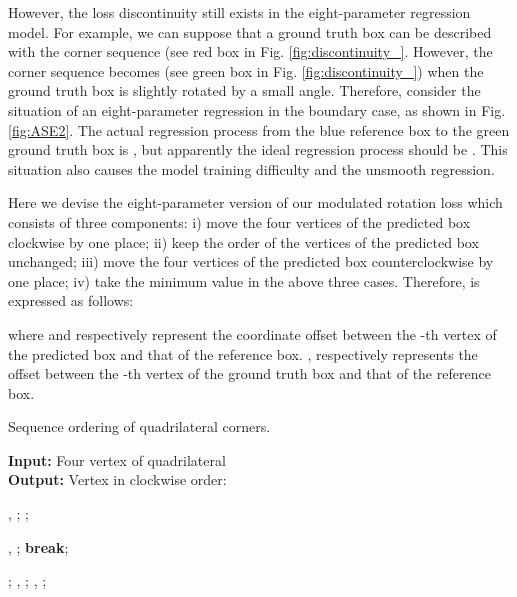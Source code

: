 \documentclass[10pt,twocolumn,letterpaper]{article}
\begin{document}
However, the loss discontinuity still exists in the eight-parameter regression model. For example, we can suppose that a ground truth box can be described with the corner sequence  (see red box in Fig. \ref{fig:discontinuity_}. However, the corner sequence becomes  (see green box in Fig. \ref{fig:discontinuity_}) when the ground truth box is slightly rotated by a small angle. Therefore, consider the situation of an eight-parameter regression in the boundary case, as shown in Fig. \ref{fig:ASE2}. The actual regression process from the blue reference box to the green ground truth box is , but apparently the ideal regression process should be . This situation also causes the model training difficulty and the unsmooth regression.

Here we devise the eight-parameter version of our modulated rotation loss which consists of three components: i) move the four vertices of the predicted box clockwise by one place; ii) keep the order of the vertices of the predicted box unchanged; iii) move the four vertices of the predicted box counterclockwise by one place; iv) take the minimum value in the above three cases. Therefore,  is expressed as follows:
    
where  and  respectively represent the coordinate offset between the -th vertex of the predicted box and that of the reference box. ,  respectively represents the offset between the -th vertex of the ground truth box and that of the reference box.

\begin{algorithm}[tb!]
        \caption{Sequence ordering of quadrilateral corners.}
        \label{alg:points_sequence}
        \hspace*{0.02in} {\bf Input:}
        Four vertex of quadrilateral \\
        \hspace*{0.02in} {\bf Output:}
        Vertex in clockwise order: 
        \begin{algorithmic}[1]
            \State , ;
            \State ;
            \State 
            
            \For{}
            \State 
            \If{}
            
            \State , ;
            \State \textbf{break};
            \EndIf
            \EndFor
            
            \For{}
            \State ;
            \If{}
            \State , ;
            \Else
            \State , ;
            \EndIf
            \EndFor
            \State \Return 
        \end{algorithmic}
\end{algorithm}
\end{document}
